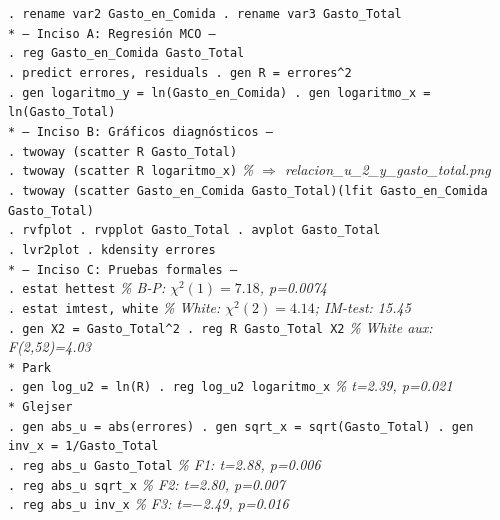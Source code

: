 \documentclass[12pt,a4paper]{article}
\begin{document}
\begin{cajacomando}[title=Log de Stata -- Problema 2.15 completo]
\footnotesize
\texttt{. rename var2 Gasto\_en\_Comida \quad . rename var3 Gasto\_Total}\\[3pt]
\texttt{* --- Inciso A: Regresión MCO ---}\\
\texttt{. reg Gasto\_en\_Comida Gasto\_Total}\\
\texttt{. predict errores, residuals \quad . gen R = errores\^{}2}\\
\texttt{. gen logaritmo\_y = ln(Gasto\_en\_Comida) \quad . gen logaritmo\_x = ln(Gasto\_Total)}\\[3pt]
\texttt{* --- Inciso B: Gráficos diagnósticos ---}\\
\texttt{. twoway (scatter R Gasto\_Total)}\\
\texttt{. twoway (scatter R logaritmo\_x)} \hfill \textit{\% $\Rightarrow$ relacion\_u\_2\_y\_gasto\_total.png}\\
\texttt{. twoway (scatter Gasto\_en\_Comida Gasto\_Total)(lfit Gasto\_en\_Comida Gasto\_Total)}\\
\texttt{. rvfplot \quad . rvpplot Gasto\_Total \quad . avplot Gasto\_Total}\\
\texttt{. lvr2plot \quad . kdensity errores}\\[3pt]
\texttt{* --- Inciso C: Pruebas formales ---}\\
\texttt{. estat hettest} \hfill \textit{\% B-P: $\chi^2(1)=7.18$, p=0.0074}\\
\texttt{. estat imtest, white} \hfill \textit{\% White: $\chi^2(2)=4.14$; IM-test: 15.45}\\
\texttt{. gen X2 = Gasto\_Total\^{}2 \quad . reg R Gasto\_Total X2} \hfill \textit{\% White aux: F(2,52)=4.03}\\[3pt]
\texttt{* Park}\\
\texttt{. gen log\_u2 = ln(R) \quad . reg log\_u2 logaritmo\_x} \hfill \textit{\% t=2.39, p=0.021}\\[3pt]
\texttt{* Glejser}\\
\texttt{. gen abs\_u = abs(errores) \quad . gen sqrt\_x = sqrt(Gasto\_Total) \quad . gen inv\_x = 1/Gasto\_Total}\\
\texttt{. reg abs\_u Gasto\_Total} \hfill \textit{\% F1: t=2.88, p=0.006}\\
\texttt{. reg abs\_u sqrt\_x} \hfill \textit{\% F2: t=2.80, p=0.007}\\
\texttt{. reg abs\_u inv\_x} \hfill \textit{\% F3: t=$-$2.49, p=0.016}\\[3pt]

\end{cajacomando}
\end{document}
